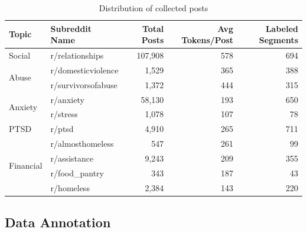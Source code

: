 \documentclass[10pt, a4paper]{article}
\begin{document}
\begin{table}
    \caption{Distribution of collected posts}
    \label{tab:dataset-distribution}
    \begin{center}
        \begin{tabular}{|l|l|r|r|r|}
            \hline
            \textbf{Topic} & \textbf{Subreddit Name} & \textbf{Total Posts} & \textbf{Avg Tokens/Post} & \textbf{Labeled Segments}\\
            \hline
            Social                     & r/relationships    & 107,908 & 578 & 694 \\ \hline
            \multirow{2}{*}{Abuse}     & r/domesticviolence & 1,529   & 365 & 388 \\
                                       & r/survivorsofabuse & 1,372   & 444 & 315 \\ \hline
            \multirow{2}{*}{Anxiety}   & r/anxiety          & 58,130  & 193 & 650 \\
                                       & r/stress           & 1,078   & 107 & 78  \\ \hline
            PTSD                       & r/ptsd             & 4,910   & 265 & 711 \\ \hline
            \multirow{4}{*}{Financial} & r/almosthomeless   & 547     & 261 & 99  \\
                                       & r/assistance       & 9,243   & 209 & 355 \\
                                       & r/food\_pantry     & 343     & 187 & 43  \\
                                       & r/homeless         & 2,384   & 143 & 220 \\ \hline
        \end{tabular}
    \end{center}
\end{table}

\subsection{Data Annotation}
\end{document}
